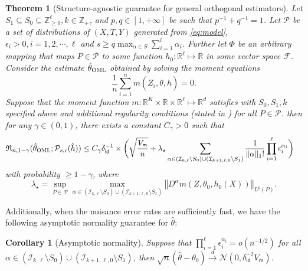 \documentclass{article}
\def\eps{{\epsilon}}
\def\gF{{\mathcal{F}}}
\def\gI{{\mathcal{I}}}
\def\gN{{\mathcal{N}}}
\def\gP{{\mathcal{P}}}
\newcommand{\R}{\mathbb{R}}
\newcommand\normx[1]{\left\Vert#1\right\Vert}
\newtheorem{theorem}{Theorem}[section]
\newtheorem{corollary}{Corollary}[section]
\newcommand{\oml}{\textsc{OML}}
\begin{document}
\begin{theorem}[Structure-agnostic guarantee for general orthogonal estimators]
    \label{thm:general-upper-bound-formal}
    Let $S_1\subseteq S_0\subseteq\mathbb{Z}_{\geq 0}^\ell, k\in\mathbb{Z}_+$, and $p,q\in[1,+\infty]$ be such that $p^{-1}+q^{-1}=1$. Let $\gP$ be a set of distributions of $(X,T,Y)$ generated from \eqref{eq:model},  $\eps_i>0, i=1,2,\cdots,\ell$ and $s \geq q\max_{\alpha\in S}\sum_{i=1}^{l}\alpha_i$. Further let $\Phi$ be an arbitrary mapping that maps $P\in\gP$ to some function $h_0:\R^{\ell}\mapsto\R$ in some vector space $\gF$. Consider the estimate $\hat{\theta}_{\oml}$ obtained by solving the moment equations
    \begin{equation}
        \label{eq:empirical-moment-equation}
        \frac{1}{n}\sum_{i=1}^n m\left(Z_i,\theta,\hat{h}\right) = 0.
    \end{equation} 
    Suppose that the moment function $m:\R^K\times\R\times\R^{\ell}\mapsto\R^d$ satisfies  with $S_0,S_1,k$ specified above and additional regularity conditions (stated in ) for all $P\in\gP$. then for any $\gamma\in(0,1)$, there exists a constant $C_{\gamma}>0$ such that 
    \begin{equation}
        \label{eq:general-upper-bound-instance}
        \begin{aligned}
            \mathfrak{R}_{n,1-\gamma} (\hat{\theta}_{\oml};\gP_{s,\eps}(\hat{h})) &\leq C_{\gamma}\delta_{\mathsf{id}}^{-1}\times
            \bigg(\sqrt{\frac{V_{\mathsf{m}}}{n}}  + \lambda_{\star}\sum_{\alpha\in  (\gI_{k,\ell}\setminus S_0)\cup (\gI_{k+1,\ell,0}\setminus S_1)} \frac{1}{\|\alpha\|_1!} \prod_{i=1}^\ell \eps_i^{\alpha_i} \bigg)
        \end{aligned}
    \end{equation}
    with probability $\geq 1-\gamma$, where \[\lambda_{\star} = \sup_{P\in\gP}\max_{\alpha\in(\gI_{k,\ell}\setminus S_0)\cup (\gI_{k+1,\ell,0}\setminus S_1)} \normx{D^{\alpha} m(Z,\theta_0,h_0(X))}_{L^p(P)}.\]
\end{theorem}

Additionally, when the nuisance error rates are sufficiently fast, we have the following asymptotic normality guarantee for $\hat{\theta}$:

\begin{corollary}[Asymptotic normality]
    \label{cor:general-confidence-interval}
    Suppose that $\prod_{i=1}^\ell \eps_i^{\alpha_i} = o(n^{-1/2})$ for all $\alpha\in(\gI_{k,\ell}\setminus S_0)\cup (\gI_{k+1,\ell,0}\setminus S_1)$, then $\sqrt{n}(\hat{\theta}-\theta_0)\xrightarrow{d}\gN(0,\delta_{\mathsf{id}}^{-2}V_{\mathsf{m}})$.
\end{corollary}
\end{document}
